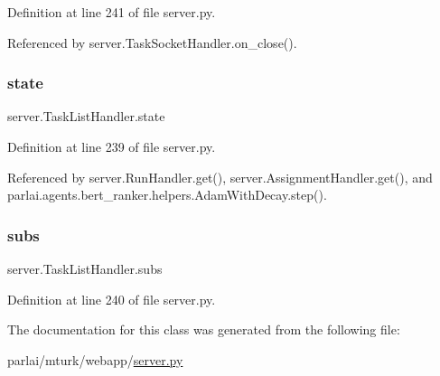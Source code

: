 Definition at line 241 of file server.\+py.



Referenced by server.\+Task\+Socket\+Handler.\+on\+\_\+close().

\mbox{\label{classserver_1_1TaskListHandler_a12cde41b09e7707bdb666f062809dacb}} 
\subsubsection{\texorpdfstring{state}{state}}
{\footnotesize\ttfamily server.\+Task\+List\+Handler.\+state}



Definition at line 239 of file server.\+py.



Referenced by server.\+Run\+Handler.\+get(), server.\+Assignment\+Handler.\+get(), and parlai.\+agents.\+bert\+\_\+ranker.\+helpers.\+Adam\+With\+Decay.\+step().

\mbox{\label{classserver_1_1TaskListHandler_ab188a6952aceade11a652921734b6174}} 
\subsubsection{\texorpdfstring{subs}{subs}}
{\footnotesize\ttfamily server.\+Task\+List\+Handler.\+subs}



Definition at line 240 of file server.\+py.



The documentation for this class was generated from the following file\+:\begin{DoxyCompactItemize}
\item 
parlai/mturk/webapp/\hyperlink{server_8py}{server.\+py}\end{DoxyCompactItemize}
